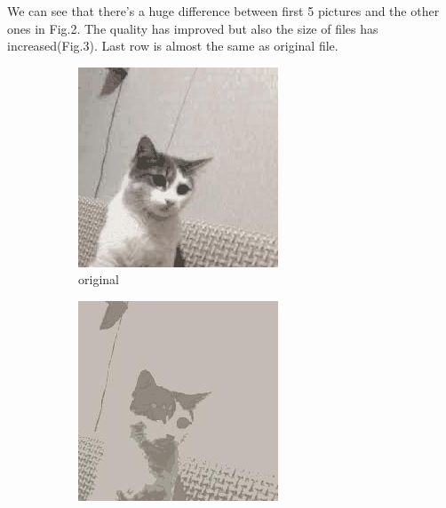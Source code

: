 \documentclass[12pt,a4paper]{article}
\begin{document}
    We can see that there's a huge difference between first 5 pictures and the other ones in Fig.2. The quality has improved but also the size of files has increased(Fig.3). Last row is almost the same as original file.
    
\begin{figure}[H]
    \centering %
\begin{subfigure}{0.25\textwidth}
  \includegraphics[width=\linewidth]{images/small/original}
  \caption{original}
  \label{fig:1}
\end{subfigure}\hfil %
\begin{subfigure}{0.25\textwidth}
  \includegraphics[width=\linewidth]{images/small/3-3-5-05}

\end{subfigure}
\end{figure}
\end{document}
